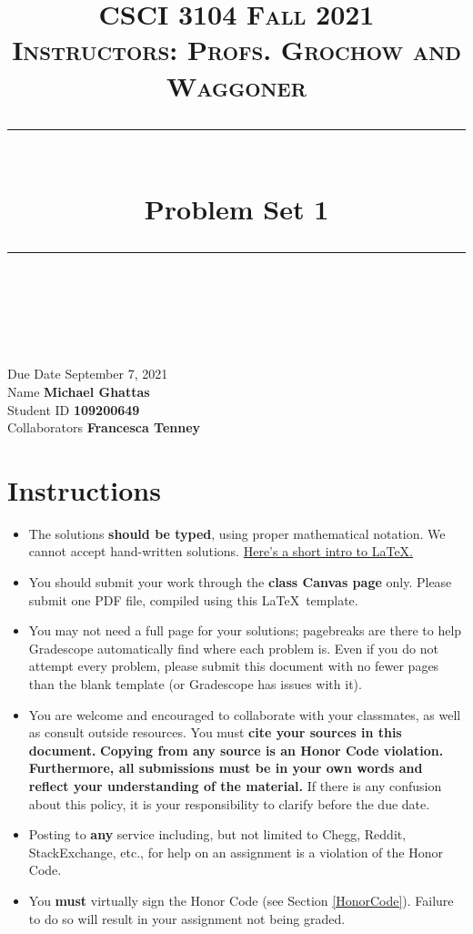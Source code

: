 \documentclass[11pt]{article}
\title{
\normalfont \normalsize 
\textsc{CSCI 3104 Fall 2021 \\ 
Instructors: Profs. Grochow and Waggoner} \\
[10pt] 
\rule{\linewidth}{0.5pt} \\[6pt] 
\huge Problem Set 1 \\
\rule{\linewidth}{2pt}  \\[10pt]
}
\date{}
\theoremstyle{definition}
\theoremstyle{definition}
\theoremstyle{definition}
\begin{document}
\maketitle


\noindent
Due Date \dotfill September 7, 2021 \\
Name \dotfill \textbf{Michael Ghattas} \\
Student ID \dotfill \textbf{109200649} \\
Collaborators \dotfill \textbf{Francesca Tenney}

\tableofcontents

\section{Instructions}
 \begin{itemize}
	\item The solutions \textbf{should be typed}, using proper mathematical notation. We cannot accept hand-written solutions. \href{http://ece.uprm.edu/~caceros/latex/introduction.pdf}{Here's a short intro to \LaTeX.}
	\item You should submit your work through the \textbf{class Canvas page} only. Please submit one PDF file, compiled using this \LaTeX \ template.
	\item You may not need a full page for your solutions; pagebreaks are there to help Gradescope automatically find where each problem is. Even if you do not attempt every problem, please submit this document with no fewer pages than the blank template (or Gradescope has issues with it).

	\item You are welcome and encouraged to collaborate with your classmates, as well as consult outside resources. You must \textbf{cite your sources in this document.} \textbf{Copying from any source is an Honor Code violation. Furthermore, all submissions must be in your own words and reflect your understanding of the material.} If there is any confusion about this policy, it is your responsibility to clarify before the due date. 

	\item Posting to \textbf{any} service including, but not limited to Chegg, Reddit, StackExchange, etc., for help on an assignment is a violation of the Honor Code.

	\item You \textbf{must} virtually sign the Honor Code (see Section \ref{HonorCode}). Failure to do so will result in your assignment not being graded.
\end{itemize}
\end{document}
